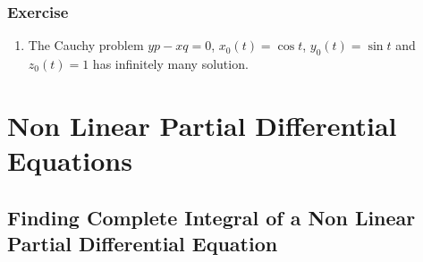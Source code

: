 \subsubsection*{Exercise}
\begin{enumerate}
	\item The Cauchy problem $yp-xq = 0$, $x_0(t) = \cos t$, $y_0(t) = \sin t$ and $z_0(t) = 1$ has infinitely many solution.
\end{enumerate}

\section{Non Linear Partial Differential Equations}
\subsection{Finding Complete Integral of a Non Linear Partial Differential Equation}
